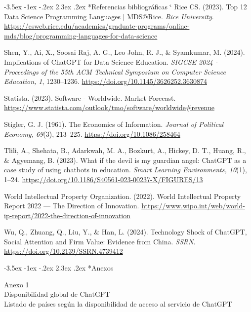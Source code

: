 \documentclass[12pt,a4paper]{article}
\makeatletter
\renewcommand{\refname}{\centering\normalfont Referencias bibliográficas}%
\renewcommand\section{\@startsection{section}{1}{\z@}%
  {-3.5ex \@plus -1ex \@minus -.2ex}%
  {2.3ex \@plus.2ex}%
  {\normalfont\normalsize}}
\renewenvironment{thebibliography}[1]{%
  \section*{\refname}%
  \list{}{%
    \usecounter{enumiv}%
    \setlength{\labelwidth}{0pt}%
    \setlength{\labelsep}{0pt}%
    \setlength{\leftmargin}{1.27cm}%
    \setlength{\itemindent}{-1.27cm}%
    \setlength{\itemsep}{\baselineskip}%
    \setlength{\parsep}{0pt}%
  }%
  \sloppy
  \clubpenalty4000\widowpenalty4000%
  \sfcode`\.\@m}%
  {\def\@noitemerr{\@latex@warning{Empty `thebibliography' environment}}%
   \endlist}
\makeatother
\begin{document}
\begin{singlespacing}
\begin{thebibliography}{}
Rice CS. (2023). Top 12 Data Science Programming Languages | MDS@Rice. \textit{Rice University}. \url{https://csweb.rice.edu/academics/graduate-programs/online-mds/blog/programming-languages-for-data-science}

Shen, Y., Ai, X., Soosai Raj, A. G., Leo John, R. J., \& Syamkumar, M. (2024). Implications of ChatGPT for Data Science Education. \textit{SIGCSE 2024 - Proceedings of the 55th ACM Technical Symposium on Computer Science Education, 1}, 1230–1236. \url{https://doi.org/10.1145/3626252.3630874}

Statista. (2023). Software - Worldwide. Market Forecast. \url{https://www.statista.com/outlook/tmo/software/worldwide#revenue}

Stigler, G. J. (1961). The Economics of Information. \textit{Journal of Political Economy, 69}(3), 213–225. \url{https://doi.org/10.1086/258464}

Tlili, A., Shehata, B., Adarkwah, M. A., Bozkurt, A., Hickey, D. T., Huang, R., \& Agyemang, B. (2023). What if the devil is my guardian angel: ChatGPT as a case study of using chatbots in education. \textit{Smart Learning Environments, 10}(1), 1–24. \url{https://doi.org/10.1186/S40561-023-00237-X/FIGURES/13}

World Intellectual Property Organization. (2022). World Intellectual Property Report 2022 — The Direction of Innovation. \url{https://www.wipo.int/web/world-ip-report/2022-the-direction-of-innovation}

Wu, Q., Zhuang, Q., Liu, Y., \& Han, L. (2024). Technology Shock of ChatGPT, Social Attention and Firm Value: Evidence from China. \textit{SSRN}. \url{https://doi.org/10.2139/SSRN.4739412}

\end{thebibliography}
\end{singlespacing}
\clearpage
{}
\section*{\centering\normalfont Anexos}

\label{anexo:1}
{\noindent Anexo 1}\\[4pt]
{\noindent Disponibilidad global de ChatGPT}\\[2pt]
\noindent Listado de países según la disponibilidad de acceso al servicio de ChatGPT
\end{document}

